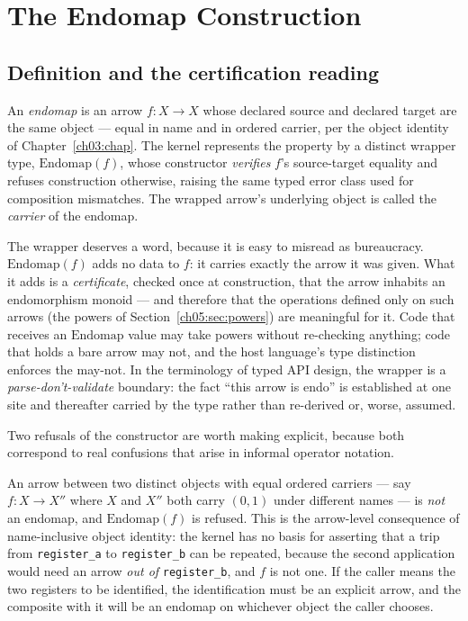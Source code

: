 \section{The Endomap Construction}
\label{ch05:sec:construction}

\subsection{Definition and the certification reading}

\begin{definition}[Endomap]
\label{ch05:def:endomap}
An \emph{endomap} is an arrow $f : X \to X$ whose declared source and
declared target are the same object --- equal in name and in ordered
carrier, per the object identity of Chapter~\ref{ch03:chap}. The kernel
represents the property by a distinct wrapper type, $\mathrm{Endomap}(f)$,
whose constructor \emph{verifies} $f$'s source-target equality and refuses
construction otherwise, raising the same typed error class used for
composition mismatches. The wrapped arrow's underlying object is called the
\emph{carrier} of the endomap.
\end{definition}

The wrapper deserves a word, because it is easy to misread as bureaucracy.
$\mathrm{Endomap}(f)$ adds no data to $f$: it carries exactly the arrow it
was given. What it adds is a \emph{certificate}, checked once at
construction, that the arrow inhabits an endomorphism monoid --- and
therefore that the operations defined only on such arrows (the powers of
Section~\ref{ch05:sec:powers}) are meaningful for it. Code that receives an
$\mathrm{Endomap}$ value may take powers without re-checking anything; code
that holds a bare arrow may not, and the host language's type distinction
enforces the may-not. In the terminology of typed API design, the wrapper is
a \emph{parse-don't-validate} boundary: the fact ``this arrow is endo'' is
established at one site and thereafter carried by the type rather than
re-derived or, worse, assumed.

Two refusals of the constructor are worth making explicit, because both
correspond to real confusions that arise in informal operator notation.

\begin{ruleenv}
\label{ch05:rule:samecarrier}
An arrow between two distinct objects with equal ordered carriers --- say
$f : X \to X''$ where $X$ and $X''$ both carry $(0, 1)$ under different
names --- is \emph{not} an endomap, and $\mathrm{Endomap}(f)$ is refused.
This is the arrow-level consequence of name-inclusive object identity: the
kernel has no basis for asserting that a trip from \texttt{register\_a} to
\texttt{register\_b} can be repeated, because the second application would
need an arrow \emph{out of} \texttt{register\_b}, and $f$ is not one. If the
caller means the two registers to be identified, the identification must be
an explicit arrow, and the composite with it will be an endomap on whichever
object the caller chooses.
\end{ruleenv}

